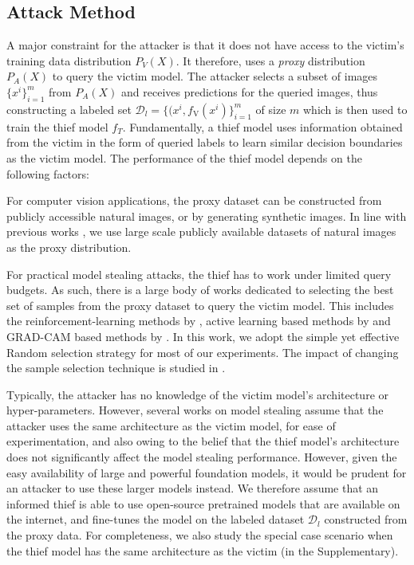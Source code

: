 \subsection{Attack Method} \label{sec:attack_method}
A major constraint for the attacker is that it does not have access to the victim's training data distribution $P_V(X)$. It therefore, uses a \textit{proxy} distribution $P_A(X)$ to query the victim model. The attacker selects a subset of images $\{x^i\}_{i=1}^m$ from $P_A(X)$ and receives predictions for the queried images, thus constructing a labeled set $\mathcal{D}_{l}=\{(x^i, f_\textrm{V}(x^i)\}_{i=1}^{m}$ of size $m$ which is then used to train the thief model $f_{T}$. Fundamentally, a thief model uses information obtained from the victim in the form of queried labels to learn similar decision boundaries as the victim model. The performance of the thief model depends on the following factors:

For computer vision applications, the proxy dataset can be constructed from publicly accessible natural images, or by generating synthetic images. In line with previous works \cite{orekondy2019knockoff,pal2020activethief}, we use large scale publicly available datasets of natural images as the proxy distribution.

 For practical model stealing attacks, the thief has to work under limited query budgets. As such, there is a large body of works dedicated to selecting the best set of samples from the proxy dataset to query the victim model. This includes the reinforcement-learning methods by \cite{orekondy2019knockoff}, active learning based methods by \cite{pal2020activethief} and GRAD-CAM based methods by \cite{wang2021black}. In this work, we adopt the simple yet effective Random selection strategy \cite{orekondy2019knockoff} for most of our experiments. The impact of changing the sample selection technique is studied in .

Typically, the attacker has no knowledge of the victim model's architecture or hyper-parameters. However, several works on model stealing assume that the attacker uses the same architecture as the victim model, for ease of experimentation, and also owing to the belief that the thief model's architecture does not significantly affect the model stealing performance. However, given the easy availability of large and powerful foundation models, it would be prudent for an attacker to use these larger models instead. We therefore assume that an informed thief is able to use open-source pretrained models that are available on the internet, and fine-tunes the model on the labeled dataset $\mathcal{D}_{l}$ constructed from the proxy data. For completeness, we also study the special case scenario when the thief model has the same architecture as the victim (in the Supplementary).

